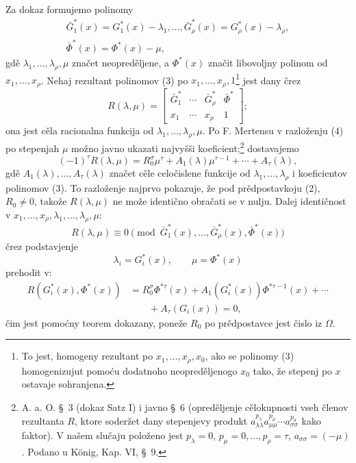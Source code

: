 \documentclass[11pt]{article}
\begin{document}
Za dokaz formujemo polinomy
\begin{equation}
\begin{gathered}
  \bar G_1^*(x)=G_1^*(x)-\lambda_1,
  \ldots,
  \bar G_\rho^*(x)=G_\rho^*(x)-\lambda_\rho,\\
  \bar\Phi^*(x)=\Phi^*(x)-\mu,
\end{gathered}
\tag{3}
\end{equation}
gdě $\lambda_1,\ldots,\lambda_\rho,\mu$ značet neopreděljene, a $\Phi^*(x)$ značit libovoljny polinom od $x_1,\ldots,x_\rho$. Nehaj rezultant polinomov (3) po $x_1,\ldots,x_\rho,1$\footnote{To jest, homogeny rezultant po $x_1,\ldots,x_\rho,x_0$, ako se polinomy (3) homogenizujut pomoću dodatnoho neopreděljenogo $x_0$ tako, že stepenj po $x$ ostavaje sohranjena.} jest dany črez
\begin{equation}
  R(\lambda,\mu)=\left[
  \begin{array}{cccc}
   \bar G_1^*&\cdots&\bar G_\rho^*&\bar\Phi^*\\
   x_1&\cdots&x_\rho&1
  \end{array}
  \right];
\tag{4}
\end{equation}
ona jest cěla racionalna funkcija od $\lambda_1,\ldots,\lambda_\rho,\mu$. Po F. Mertensu v razloženju (4) po stepenjah $\mu$ možno javno ukazati najvyšši koeficient;\footnote{A. a. O. \S\ 3 (dokaz Satz I) i javno \S\ 6 (opreděljenje cělokupnosti vseh členov rezultanta $R$, ktore soderžet dany stepenjevy produkt $a_{\lambda\lambda}^{p_\lambda} a_{\mu\mu}^{p_\mu}\cdots a_{\sigma\sigma}^{p_\sigma}$ kako faktor). V našem slučaju položeno jest $p_\lambda=0$, $p_\mu=0,\ldots,p_\rho=\tau$, $a_{\sigma\sigma}=(-\mu)$. Podano u König, Kap. VI, \S\ 9.} dostavajemo
\begin{equation}
  (-1)^\tau R(\lambda,\mu)
  =R_0^\sigma\mu^\tau+A_1(\lambda)\mu^{\tau-1}+\cdots+A_\tau(\lambda),
\tag{5}
\end{equation}
gdě $A_1(\lambda),\ldots,A_\tau(\lambda)$ značet cěle celočislene funkcije od $\lambda_1,\ldots,\lambda_\rho$ i koeficientov polinomov (3). To razloženje najprvo pokazuje, že pod prědpostavkoju (2), $R_0\ne0$, takože $R(\lambda,\mu)$ ne može identično obračati se v nulju. Dalej identičnost v $x_1,\ldots,x_\rho,\lambda_1,\ldots,\lambda_\rho,\mu$:
\[
  R(\lambda,\mu)\equiv 0\pmod{\bar G_1^*(x),\ldots,
  \bar G_\rho^*(x),\bar\Phi^*(x)}
\]
črez podstavjenje
\[
  \lambda_i=G_i^*(x),\qquad \mu=\Phi^*(x)
\]
prehodit v:
\begin{equation}
\begin{aligned}
  R(G_i^*(x),\Phi^*(x))
  &=R_0^\sigma\Phi^{*\tau}(x)
    +A_1(G_i^*(x))\Phi^{*\tau-1}(x)+\cdots \\
  &\qquad +A_\tau(G_i(x))=0,
\end{aligned}
\tag{6}
\end{equation}
čim jest pomoćny teorem dokazany, poneže $R_0$ po prědpostavce jest čislo iz $\Omega$.
\end{document}
